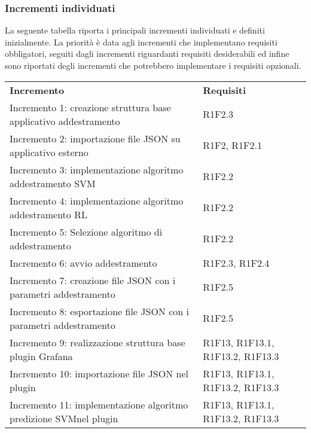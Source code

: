 \subsubsection{Incrementi individuati}
La seguente tabella riporta i principali incrementi individuati e definiti inizialmente. La priorità è data agli incrementi che implementano requisiti obbligatori, seguiti dagli incrementi riguardanti requisiti desiderabili ed infine sono riportati degli incrementi che potrebbero implementare i requisiti opzionali.
\begin{longtable} {
		>{}p{85mm}
		>{\raggedleft\arraybackslash}p{40mm}
	}
	\rowcolor{gray!50} 
	\textbf{Incremento} & 
	\textbf{Requisiti} 	\TBstrut \\
	
	Incremento 1: creazione struttura base applicativo addestramento &
	R1F2.3  \TBstrut \\ [2mm]		
	
	Incremento 2: importazione file JSON su applicativo esterno & 
	R1F2, R1F2.1  \TBstrut \\ [2mm]
	
	Incremento 3: implementazione algoritmo addestramento SVM\glosp & 
	R1F2.2  \TBstrut \\ [2mm]
	
	Incremento 4: implementazione algoritmo addestramento RL\glosp & 
	R1F2.2  \TBstrut \\ [2mm]
	
	Incremento 5: Selezione algoritmo di addestramento & 
	R1F2.2  \TBstrut \\ [2mm]
	
	Incremento 6: avvio addestramento\glosp & 
	R1F2.3, R1F2.4 \TBstrut \\ [2mm]
	
	Incremento 7: creazione file JSON con i parametri addestramento &
	R1F2.5 \TBstrut \\ [2mm]
	
	Incremento 8: esportazione file JSON con i parametri addestramento &
	R1F2.5 \TBstrut \\ [2mm]
	
	Incremento 9: realizzazione struttura base plugin Grafana\glosp &
	R1F13, R1F13.1, R1F13.2, R1F13.3 \TBstrut \\ [2mm]
	
	Incremento 10: importazione file JSON nel plugin &
	R1F13, R1F13.1, R1F13.2, R1F13.3 \TBstrut \\ [2mm]
	
	Incremento 11: implementazione algoritmo predizione SVM\glosp nel plugin &
	R1F13, R1F13.1, R1F13.2, R1F13.3 \TBstrut \\ [2mm]
	

\end{longtable}
